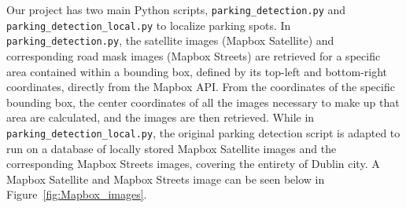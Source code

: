 Our project has two main Python scripts, \texttt{parking\_detection.py} and \texttt{parking\_detection\_local.py} to localize parking spots.
In \texttt{parking\_detection.py}, the satellite images (Mapbox Satellite) and corresponding road mask images (Mapbox Streets) are retrieved for a specific area contained within a bounding box, defined by its top-left and bottom-right coordinates, directly from the Mapbox API.
From the coordinates of the specific bounding box, the center coordinates of all the images necessary to make up that area are calculated, and the images are then retrieved.
While in \texttt{parking\_detection\_local.py}, the original parking detection script is adapted to run on a database of locally stored Mapbox Satellite images and the corresponding Mapbox Streets images, covering the entirety of Dublin city.
A Mapbox Satellite and Mapbox Streets image can be seen below in Figure~\ref{fig:Mapbox_images}.

